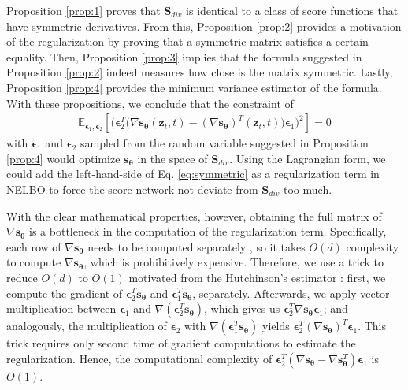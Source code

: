 \documentclass{article}
\theoremstyle{definition}
\theoremstyle{remark}
\begin{document}
	Proposition \ref{prop:1} proves that $\mathbf{S}_{div}$ is identical to a class of score functions that have symmetric derivatives. From this, Proposition \ref{prop:2} provides a motivation of the regularization by proving that a symmetric matrix satisfies a certain equality.  Then, Proposition \ref{prop:3} implies that the formula suggested in Proposition \ref{prop:2} indeed measures how close is the matrix symmetric. Lastly, Proposition \ref{prop:4} provides the minimum variance estimator of the formula. With these propositions, we conclude that the constraint of
	\begin{align}\label{eq:symmetric}
	\mathbb{E}_{\bm{\epsilon}_{1},\bm{\epsilon}_{2}}\left[\Big(\bm{\epsilon}_{2}^{T}\big(\nabla\mathbf{s}_{\bm{\theta}}(\mathbf{z}_{t},t)-(\nabla\mathbf{s}_{\bm{\theta}})^{T}(\mathbf{z}_{t},t)\big)\bm{\epsilon}_{1}\Big)^{2}\right]=0
	\end{align}
	with $\bm{\epsilon}_{1}$ and $\bm{\epsilon}_{2}$ sampled from the random variable suggested in Proposition \ref{prop:4} would optimize $\mathbf{s}_{\bm{\theta}}$ in the space of $\mathbf{S}_{div}$. Using the Lagrangian form, we could add the left-hand-side of Eq. \eqref{eq:symmetric} as a regularization term in NELBO to force the score network not deviate from $\mathbf{S}_{div}$ too much. 
	
	With the clear mathematical properties, however, obtaining the full matrix of $\nabla\mathbf{s}_{\bm{\theta}}$ is a bottleneck in the computation of the regularization term. Specifically, each row of $\nabla\mathbf{s}_{\bm{\theta}}$ needs to be computed separately \cite{song2020sliced}, so it takes $O(d)$ complexity to compute $\nabla\mathbf{s}_{\bm{\theta}}$, which is prohibitively expensive. Therefore, we use a trick to reduce $O(d)$ to $O(1)$ motivated from the Hutchinson's estimator \cite{hutchinson1989stochastic, chen2019residual}: first, we compute the gradient of $\bm{\epsilon}_{2}^{T}\mathbf{s}_{\bm{\theta}}$ and $\bm{\epsilon}_{1}^{T}\mathbf{s}_{\bm{\theta}}$, separately. Afterwards, we apply vector multiplication between $\bm{\epsilon}_{1}$ and $\nabla(\bm{\epsilon}_{2}^{T}\mathbf{s}_{\bm{\theta}})$, which gives us $\bm{\epsilon}_{2}^{T}\nabla\mathbf{s}_{\bm{\theta}}\bm{\epsilon}_{1}$; and analogously, the multiplication of $\bm{\epsilon}_{2}$ with $\nabla(\bm{\epsilon}_{1}^{T}\mathbf{s}_{\bm{\theta}})$ yields $\bm{\epsilon}_{2}^{T}(\nabla\mathbf{s}_{\bm{\theta}})^{T}\bm{\epsilon}_{1}$. This trick requires only second time of gradient computations to estimate the regularization. Hence, the computational complexity of $\bm{\epsilon}_{2}^{T}(\nabla\mathbf{s}_{\bm{\theta}}-\nabla\mathbf{s}_{\bm{\theta}}^{T})\bm{\epsilon}_{1}$ is $O(1)$.
	
\end{document}
